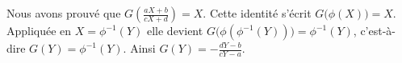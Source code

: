 {\begin{enumerate}
{Nous avons prouvé que $G\left( \frac{aX+b}{cX+d}\right) =X$.
Cette identité s'écrit $G\big( \phi(X) \big)=X$.
Appliquée en $X = \phi^{-1}(Y)$ elle devient
$G\big( \phi( \phi^{-1}(Y) ) \big)=\phi^{-1}(Y)$, c'est-à-dire
$G(Y) = \phi^{-1}(Y)$.
Ainsi $G(Y) = -\frac{dY-b}{cY-a}$.}
\end{enumerate}
}